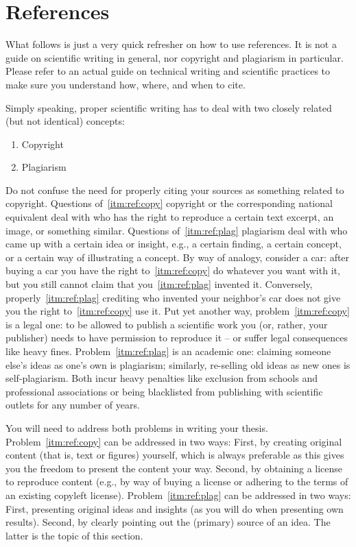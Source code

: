 \documentclass[]{nsm-thesis}
\begin{document}
\clearpage
\section{References}

What follows is just a very quick refresher on how to use references.
It is not a guide on scientific writing in general, nor copyright and plagiarism in particular.
Please refer to an actual guide on technical writing and scientific practices to make sure you understand how, where, and when to cite.

Simply speaking, proper scientific writing has to deal with two closely related (but not identical) concepts:
\begin{enumerate}[label=\alph*),ref=(\alph*)]
\item\label{itm:ref:copy}
Copyright
\item
Plagiarism\label{itm:ref:plag}
\end{enumerate}
Do not confuse the need for properly citing your sources as something related to copyright.
Questions of~\ref{itm:ref:copy} copyright or the corresponding national equivalent deal with who has the right to reproduce a certain text excerpt, an image, or something similar.
Questions of~\ref{itm:ref:plag} plagiarism deal with who came up with a certain idea or insight, e.g., a certain finding, a certain concept, or a certain way of illustrating a concept.
By way of analogy, consider a car: after buying a car you have the right to~\ref{itm:ref:copy} do whatever you want with it, but you still cannot claim that you~\ref{itm:ref:plag} invented it.
Conversely, properly~\ref{itm:ref:plag} crediting who invented your neighbor's car does not give you the right to~\ref{itm:ref:copy} use it.
Put yet another way, problem~\ref{itm:ref:copy} is a legal one: to be allowed to publish a scientific work you (or, rather, your publisher) needs to have permission to reproduce it -- or suffer legal consequences like heavy fines.
Problem~\ref{itm:ref:plag} is an academic one: claiming someone else's ideas as one's own is plagiarism; similarly, re-selling old ideas as new ones is self-plagiarism.
Both incur heavy penalties like exclusion from schools and professional associations or being blacklisted from publishing with scientific outlets for any number of years.

You will need to address both problems in writing your thesis.
Problem~\ref{itm:ref:copy} can be addressed in two ways:
First, by creating original content (that is, text or figures) yourself, which is always preferable as this gives you the freedom to present the content your way.
Second, by obtaining a license to reproduce content (e.g., by way of buying a license or adhering to the terms of an existing copyleft license).
Problem~\ref{itm:ref:plag} can be addressed in two ways:
First, presenting original ideas and insights (as you will do when presenting own results).
Second, by clearly pointing out the (primary) source of an idea.
The latter is the topic of this section.
\end{document}
